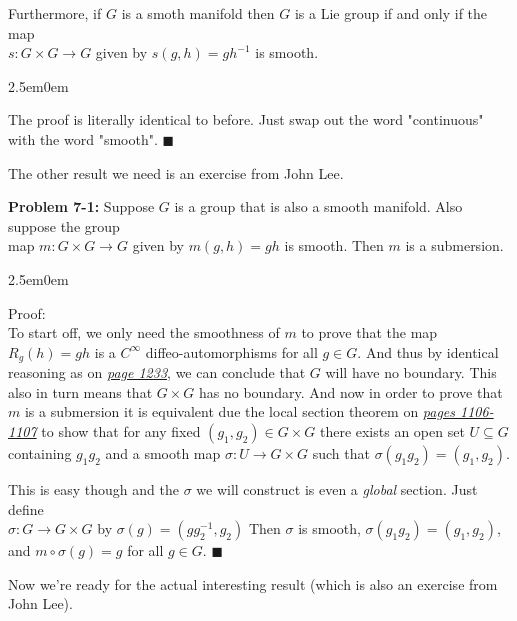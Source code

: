 \documentclass{book}
\newcommand{\inLinkRap}[2]{{\color{blue}\hyperlink{#1}{\textit{#2}}}}
\newcommand{\hTwo}{%
\color{Black}%
   \fontsize{13}{15}\selectfont%
}
\newcommand{\exThreeP}{%
   \color{RedViolet}%
   \fontsize{12}{14}\selectfont%
}
\newcommand{\Hstatement}{%
   \color{MidnightBlue!90!Black}%
   \fontsize{12}{13}\selectfont%
}
\newcommand{\HexOne}{%
   \color{Purple}%
   \fontsize{12}{13}\selectfont%
}
\newenvironment{myIndent}{%
   \begin{adjustwidth}{2.5em}{0em}%
}{%
   \end{adjustwidth}%
}
\newcommand{\blab}[1]{\textbf{#1}}
\newcommand{\retTwo}{\hfill\bigbreak}
\begin{document}
Furthermore, if $G$ is a smoth manifold then $G$ is a Lie group if and only if the map\\ $s: G \times G \to G$ given by $s(g, h) = gh^{-1}$ is smooth.
\begin{myIndent}\exThreeP
	The proof is literally identical to before. Just swap out the word "continuous" with the word "smooth". $\blacksquare$\retTwo
\end{myIndent}

\hTwo The other result we need is an exercise from John Lee.\retTwo


\Hstatement\blab{Problem 7-1:} Suppose $G$ is a group that is also a smooth manifold. Also suppose the group\\ map $m: G \times G \to G$ given by $m(g, h) = gh$ is smooth. Then $m$ is a submersion.
\begin{myIndent}\HexOne
	Proof:\\
	To start off, we only need the smoothness of $m$ to prove that the map $R_g(h) = gh$ is a $C^\infty$ diffeo-automorphisms for all $g \in G$. And thus by identical reasoning as on \inLinkRap{Page 1233 Reference}{page 1233}, we can conclude that $G$ will have no boundary. This also in turn means that $G \times G$ has no boundary. And now in order to prove that $m$ is a submersion it is equivalent due the local section theorem on \inLinkRap{Local Section Theorem page 1106}{pages 1106-1107} to show that for any fixed $(g_1, g_2) \in G \times G$ there exists an open set $U \subseteq G$ containing $g_1g_2$ and a smooth map $\sigma: U \to G \times G$ such that $\sigma(g_1g_2) = (g_1, g_2)$.\newpage

	This is easy though and the $\sigma$ we will construct is even a \textit{global} section. Just define\\ $\sigma: G \to G \times G$ by $\sigma(g) = (gg_2^{-1}, g_2)$ Then $\sigma$ is smooth, $\sigma(g_1g_2) = (g_1, g_2)$,\\ and $m \circ \sigma(g) = g$ for all $g \in G$. $\blacksquare$\retTwo
\end{myIndent}

\hTwo Now we're ready for the actual interesting result (which is also an exercise from John Lee).\retTwo

\end{document}
